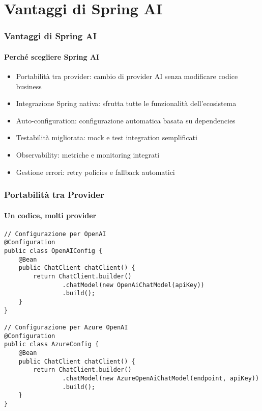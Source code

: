 \section{Vantaggi di Spring AI} %
\label{sec:spring_ai_advantages}
%
\begin{frame}[t,fragile] \frametitle{Vantaggi di Spring AI}
	{\small
		\framesubtitle{Perché scegliere Spring AI}
		\begin{itemize}[leftmargin=10pt,align=right]
			\onslide<1->\item[\alert{\faArrowCircleRight}] \alert{Portabilità tra provider:} cambio di provider AI senza modificare codice business
			\onslide<2->\item[\alert{\faArrowCircleRight}] \alert{Integrazione Spring nativa:} sfrutta tutte le funzionalità dell'ecosistema
			\onslide<3->\item[\alert{\faArrowCircleRight}] \alert{Auto-configuration:} configurazione automatica basata su dependencies
			\onslide<4->\item[\alert{\faArrowCircleRight}] \alert{Testabilità migliorata:} mock e test integration semplificati
			\onslide<5->\item[\alert{\faArrowCircleRight}] \alert{Observability:} metriche e monitoring integrati
			\onslide<6->\item[\alert{\faArrowCircleRight}] \alert{Gestione errori:} retry policies e fallback automatici
		\end{itemize}
	}
\end{frame}
%
\begin{frame}[t,fragile] \frametitle{Portabilità tra Provider}
	{\small
		\framesubtitle{Un codice, molti provider}
\begin{verbatim}
// Configurazione per OpenAI
@Configuration
public class OpenAIConfig {
    @Bean
    public ChatClient chatClient() {
        return ChatClient.builder()
                .chatModel(new OpenAiChatModel(apiKey))
                .build();
    }
}

// Configurazione per Azure OpenAI  
@Configuration
public class AzureConfig {
    @Bean  
    public ChatClient chatClient() {
        return ChatClient.builder()
                .chatModel(new AzureOpenAiChatModel(endpoint, apiKey))
                .build();
    }
}
\end{verbatim}
	}
\end{frame}
